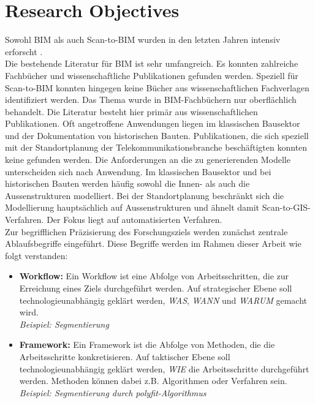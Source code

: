 \section{Research Objectives}
\label{sec:research_objectives}
\begin{German}
    Sowohl BIM als auch Scan-to-BIM wurden in den letzten Jahren intensiv erforscht \cite{rochaSurveyScantoBIMPractices2021}. \\
    Die bestehende Literatur für BIM ist sehr umfangreich. Es konnten zahlreiche Fachbücher und wissenschaftliche Publikationen gefunden werden. Speziell für Scan-to-BIM konnten hingegen keine Bücher aus wissenschaftlichen Fachverlagen identifiziert werden. Das Thema wurde in BIM-Fachbüchern nur oberflächlich behandelt. Die Literatur besteht hier primär aus wissenschaftlichen Publikationen. Oft angetroffene Anwendungen liegen im klassischen Bausektor und der Dokumentation von historischen Bauten. Publikationen, die sich speziell mit der Standortplanung der Telekommunikationsbranche beschäftigten konnten keine gefunden werden. Die Anforderungen an die zu generierenden Modelle unterscheiden sich nach Anwendung. Im klassischen Bausektor und bei historischen Bauten werden häufig sowohl die Innen- als auch die Aussenstrukturen modelliert. Bei der Standortplanung beschränkt sich die Modellierung hauptsächlich auf Aussenstrukturen und ähnelt damit Scan-to-GIS-Verfahren. Der Fokus liegt auf automatisierten Verfahren. \\

    Zur begrifflichen Präzisierung des Forschungsziels werden zunächst zentrale Ablaufsbegriffe eingeführt. Diese Begriffe werden im Rahmen dieser Arbeit wie folgt verstanden:
    
    \begin{itemize}
        \item \textbf{Workflow:} Ein Workflow ist eine Abfolge von Arbeitsschritten, die zur Erreichung eines Ziels durchgeführt werden. Auf strategischer Ebene soll technologieunabhängig geklärt werden, \textit{WAS}, \textit{WANN} und \textit{WARUM} gemacht wird.\\
        \textit{Beispiel: Segmentierung}

        \item \textbf{Framework:} Ein Framework ist die Abfolge von Methoden, die die Arbeitsschritte konkretisieren. Auf taktischer Ebene soll technologieunabhängig geklärt werden, \textit{WIE} die Arbeitsschritte durchgeführt werden. Methoden können dabei z.B. Algorithmen oder Verfahren sein.\\
        \textit{Beispiel: Segmentierung durch polyfit-Algorithmus}
        

\end{itemize}
\end{German}
